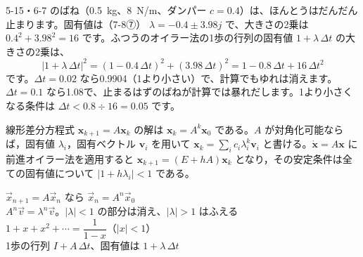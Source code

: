 \begin{motto}[5]
5-15・6-7 のばね（\qty{0.5}{kg}、\qty{8}{N/m}、ダンパー $c=0.4$）は、ほんとうはだんだん止まります。固有値は（7-8⑦） $\lambda=-0.4\pm3.98j$ で、大きさの2乗は $0.4^2+3.98^2=16$ です。ふつうのオイラー法の1歩の行列の固有値 $1+\lambda\,\Delta t$ の大きさの2乗は、
\[ |1+\lambda\,\Delta t|^2=(1-0.4\,\Delta t)^2+(3.98\,\Delta t)^2=1-0.8\,\Delta t+16\,\Delta t^2 \]
です。$\Delta t=0.02$ なら0.9904（1より小さい）で、計算でもゆれは消えます。$\Delta t=0.1$ なら1.08で、止まるはずのばねが計算では暴れだします。1より小さくなる条件は $\Delta t<0.8\div16=0.05$ です。
\end{motto}

\begin{senmonsho}[大学の教科書ふうの書き方]
\begin{bkhonbun}
線形差分方程式 $\symbf{x}_{k+1}=A\symbf{x}_k$ の解は $\symbf{x}_k=A^k\symbf{x}_0$ である。$A$ が対角化可能ならば，固有値 $\lambda_i$，固有ベクトル $\symbf{v}_i$ を用いて $\symbf{x}_k=\sum_ic_i\lambda_i^k\symbf{v}_i$ と書ける。$\dot{\symbf{x}}=A\symbf{x}$ に前進オイラー法を適用すると $\symbf{x}_{k+1}=(E+hA)\symbf{x}_k$ となり，その安定条件は全ての固有値について $|1+h\lambda_i|<1$ である。
\end{bkhonbun}
\end{senmonsho}

\begin{taisetsu}
\def\tsl#1{\makebox[7.4\zw][l]{\sffamily\bfseries\small\color{\bkTT}#1}}
\tsl{くり返し}$\vec x_{n+1}=A\vec x_n$ なら $\vec x_n=A^n\vec x_0$\\[3pt]
\tsl{行き先}$A^n\vec v=\lambda^n\vec v$。$|\lambda|<1$ の部分は消え、$|\lambda|>1$ はふえる\\[3pt]
\tsl{等比級数}$1+x+x^2+\cdots=\dfrac{1}{1-x}$（$|x|<1$）\\[3pt]
\tsl{オイラー法}1歩の行列 $I+A\,\Delta t$、固有値は $1+\lambda\,\Delta t$
\end{taisetsu}

\begin{kotoba}
\small
{}
\end{kotoba}

